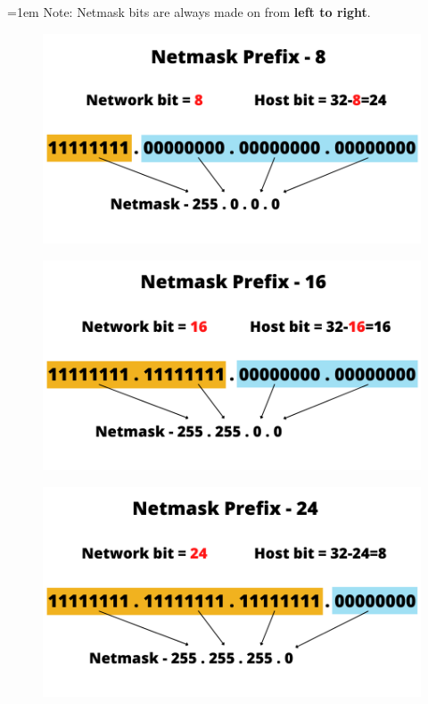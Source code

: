 \begin{flushleft}
\begin{itemize}
\begin{itemize}
	\end{itemize}	
\end{itemize}
\begin{tcolorbox}[breakable,notitle,boxrule=-0pt,colback=yellow,colframe=yellow]
	\color{black}
	\font=1em
	Note: Netmask bits are always made \color{blue} on \color{black} from \textbf{left to right}.
	\font=4pt
\end{tcolorbox}
\begin{figure}[h!]
	\centering
	\includegraphics[scale=0.5]{content/chapter14/images/18.png}
\end{figure}
\bigskip
\begin{figure}[h!]
	\centering
	\includegraphics[scale=0.5]{content/chapter14/images/19.png}
\end{figure}
\bigskip
\begin{figure}[h!]
	\centering
	\includegraphics[scale=0.5]{content/chapter14/images/20.png}

\end{figure}
\end{flushleft}
